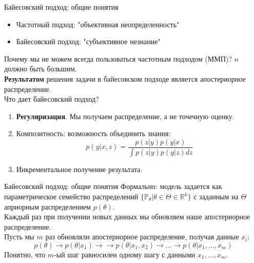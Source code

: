 \documentclass[handout]{beamer}
\begin{document}
\begin{frame}{Байесовский подход: общие понятия}
	\begin{itemize}
		\item Частотный подход: "объективная неопределенность"
		\item Байесовский подход: "субъективное незнание"
	\end{itemize}
	Почему мы не можем всегда пользоваться частотным подходом (ММП)? $n$ должно быть большим.\\
	\textbf{Результатом} решения задачи в байесовском подходе является апостериорное распределение.\\
	Что дает байесовский подход?
	\begin{enumerate}
		\item \textbf{Регуляризация}. Мы получаем распределение, а не точечную оценку.
		\item Композитность: возможность объединить знания:
		\begin{equation*}
			p(y|x, z)=\frac{p(z|y)p(y|x)}{\int p(z|y)p(y|z)dz}
		\end{equation*}
		\item Инкрементальное получение результата.
	\end{enumerate}
\end{frame}

\begin{frame}{Байесовский подход: общие понятия}
	Формально: модель задается как параметрическое семейство распределений $\{\mathbb{P}_{\theta}|\theta\in\Theta\in\mathbb{R}^k\}$ с заданным на $\Theta$ априорным распределением $p(\theta)$.\\
	Каждый раз при получении новых данных мы обновляем наше апостериорное распределение.\\
	Пусть мы $m$ раз обновляли апостериорное распределение, получая данные $x_i$:
	\begin{equation*}
		p(\theta)\rightarrow p(\theta | x_1) \rightarrow \rightarrow p(\theta | x_1, x_2) \rightarrow \dots \rightarrow p(\theta | x_1, \dots, x_m)
	\end{equation*}
	Понятно, что $m$-ый шаг равносилен одному шагу с данными $x_1,\dots,x_m$.
\end{frame}
\end{document}
